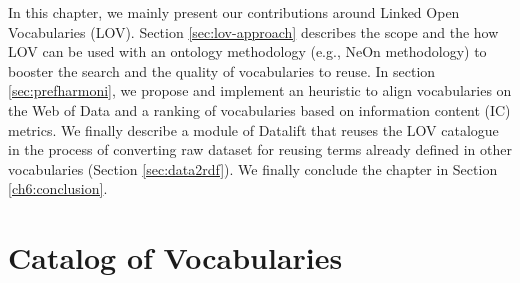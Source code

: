 In this chapter, we mainly present our contributions around Linked Open Vocabularies (LOV). Section \ref{sec:lov-approach} describes the scope and the how LOV can be used with an ontology methodology (e.g., NeOn methodology) to booster the search and the quality of vocabularies to reuse. In section \ref{sec:prefharmoni}, we propose and implement an heuristic to align vocabularies on the Web of Data and a ranking of vocabularies based on information content (IC) metrics. We finally describe a module of Datalift that reuses the LOV catalogue in the process of converting raw dataset for reusing terms already defined in other vocabularies (Section \ref{sec:data2rdf}). We finally conclude the chapter in Section \ref{ch6:conclusion}.  



\section{Catalog of Vocabularies}
\label{sec:catalog}

